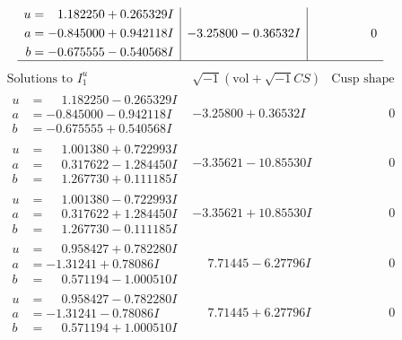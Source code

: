 \documentclass[1p]{elsarticle_modified}
\theoremstyle{definition}
\newcommand{\I}{\sqrt{-1}}
\begin{document}
$$\begin{array}{c|c|c}
\begin{aligned}
u &= \phantom{-}1.182250 + 0.265329 I \\
a &= -0.845000 + 0.942118 I \\
b &= -0.675555 - 0.540568 I\end{aligned}
 & -3.25800 - 0.36532 I & \phantom{-0.000000 } 0\\
 \hline 
 \end{array}$$\newpage$$\begin{array}{c|c|c}  
\text{Solutions to }I^u_{1}& \I (\text{vol} + \sqrt{-1}CS) & \text{Cusp shape}\\
 \hline 
\begin{aligned}
u &= \phantom{-}1.182250 - 0.265329 I \\
a &= -0.845000 - 0.942118 I \\
b &= -0.675555 + 0.540568 I\end{aligned}
 & -3.25800 + 0.36532 I & \phantom{-0.000000 } 0 \\ \hline\begin{aligned}
u &= \phantom{-}1.001380 + 0.722993 I \\
a &= \phantom{-}0.317622 - 1.284450 I \\
b &= \phantom{-}1.267730 + 0.111185 I\end{aligned}
 & -3.35621 - 10.85530 I & \phantom{-0.000000 } 0 \\ \hline\begin{aligned}
u &= \phantom{-}1.001380 - 0.722993 I \\
a &= \phantom{-}0.317622 + 1.284450 I \\
b &= \phantom{-}1.267730 - 0.111185 I\end{aligned}
 & -3.35621 + 10.85530 I & \phantom{-0.000000 } 0 \\ \hline\begin{aligned}
u &= \phantom{-}0.958427 + 0.782280 I \\
a &= -1.31241 + 0.78086 I \\
b &= \phantom{-}0.571194 - 1.000510 I\end{aligned}
 & \phantom{-}7.71445 - 6.27796 I & \phantom{-0.000000 } 0 \\ \hline\begin{aligned}
u &= \phantom{-}0.958427 - 0.782280 I \\
a &= -1.31241 - 0.78086 I \\
b &= \phantom{-}0.571194 + 1.000510 I\end{aligned}
 & \phantom{-}7.71445 + 6.27796 I & \phantom{-0.000000 } 0 \\ \hline\begin{aligned}

\end{aligned}
\end{array}$$
\end{document}
